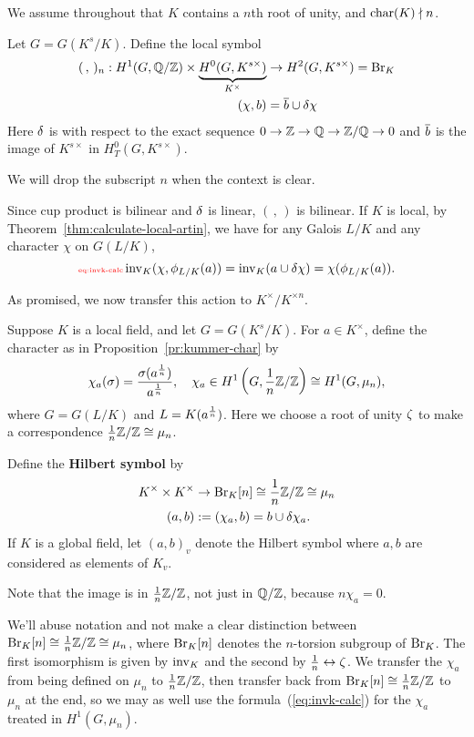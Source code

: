 We assume throughout that $K$ contains a $n$th root of unity, and $\operatorname{char}(K)\nmid n$.
\begin{df}
Let $G=G(K^s/K)$. 
Define the local symbol 
\begin{align*}(\,,\,)_n:H^1(G,\mathbb{Q}/\mathbb{Z})\times  \underbrace{H^0(G,K^{s\times})}_{K^{\times}}&\to H^2(G,K^{s\times})=\operatorname{Br}_K\\
(\chi,b)&=\overline{b}\cup \delta \chi
\end{align*}
Here $\delta$ is with respect to the exact sequence $0\to \mathbb{Z}\to \mathbb{Q}\to \mathbb{Z}/\mathbb{Q}\to 0$ and $\overline{b}$ is the image of $K^{s\times}$ in $H_T^0(G,K^{s\times})$.

We will drop the subscript $n$ when the context is clear.
\end{df}
Since cup product is bilinear and $\delta$ is linear, $(\,,\,)$ is bilinear.
If $K$ is local, by Theorem~\ref{thm:calculate-local-artin}, we have for any Galois $L/K$ and any character $\chi$ on $G(L/K)$,
\begin{equation}\llabel{eq:invk-calc}
\inv_K(\chi,\phi_{L/K}(a))=\inv_K(a\cup \de \chi)=\chi(\phi_{L/K}(a)).
\end{equation}

As promised, we now transfer this action to $K^{\times}/K^{\times n}$.
\begin{df}
Suppose $K$ is a local field, and let $G=G(K^s/K)$. %
For $a\in K^{\times}$, define the character as in Proposition~\ref{pr:kummer-char} by 
\[\chi_a(\sigma)=\frac{\sigma(a^{\frac{1}{n}})}{a^{\frac{1}{n}}},\quad \chi_a\in H^1\left( {G,\frac{1}{n}\mathbb{Z}/\mathbb{Z}} \right)\cong H^1(G,\mu_{n}),\]
where $G=G(L/K)$ and $L=K(a^{\frac{1}{n}})$.
Here we choose a root of unity $\zeta$ to make a correspondence $\frac{1}{n}\mathbb{Z}/\mathbb{Z}\cong \mu_n$.

Define the \textbf{Hilbert symbol} by 
\begin{align*}
K^{\times}\times K^{\times}&\to \operatorname{Br}_K[n]\cong \frac{1}{n}\mathbb{Z}/\mathbb{Z}\cong 
\mu_n\\
(a,b)&:=(\chi_a,b)=b\cup \delta \chi_a.
\end{align*}
If $K$ is a global field, let $(a,b)_v$ denote the Hilbert symbol where $a,b$ are considered as elements of $K_v$.
\end{df}
Note that the image is in $\frac{1}{n}\mathbb{Z}/\mathbb{Z}$, not just in $\mathbb{Q}/\mathbb{Z}$, because $n\chi_a=0$.

We'll abuse notation and not make a clear distinction between $ \operatorname{Br}_K[n]\cong\frac{1}{n}\mathbb{Z}/\mathbb{Z}\cong \mu_n$, where $\operatorname{Br}_K[n]$ denotes the $n$-torsion subgroup of $\operatorname{Br}_K$. The first isomorphism is given by $\operatorname{inv}_K$ and the second by $\frac{1}{n}\leftrightarrow \zeta$. We transfer the $\chi_a$ from being defined on $\mu_n$ to $\frac{1}{n}\mathbb{Z}/\mathbb{Z}$, then transfer back from $\operatorname{Br}_K[n]\cong \frac{1}{n}\mathbb{Z}/\mathbb{Z}$ to $\mu_n$ at the end, so we may as well use the formula~(\ref{eq:invk-calc}) for the $\chi_a$ treated in $H^1(G,\mu_{n})$.

